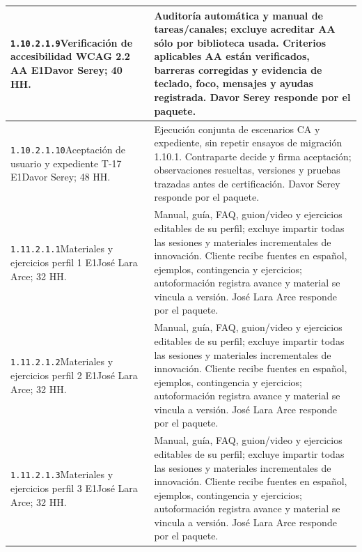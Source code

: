 \begin{longtable}{L{52mm}L{91mm}}
\texttt{1.\allowbreak{}10.\allowbreak{}2.\allowbreak{}1.\allowbreak{}9}\newline Verificación de accesibilidad WCAG 2.2 AA E1\newline Davor Serey; 40 HH. & Auditoría automática y manual de tareas/canales; excluye acreditar AA sólo por biblioteca usada. Criterios aplicables AA están verificados, barreras corregidas y evidencia de teclado, foco, mensajes y ayudas registrada. Davor Serey responde por el paquete.\\\hline
\texttt{1.\allowbreak{}10.\allowbreak{}2.\allowbreak{}1.\allowbreak{}10}\newline Aceptación de usuario y expediente T-17 E1\newline Davor Serey; 48 HH. & Ejecución conjunta de escenarios CA y expediente, sin repetir ensayos de migración 1.10.1. Contraparte decide y firma aceptación; observaciones resueltas, versiones y pruebas trazadas antes de certificación. Davor Serey responde por el paquete.\\\hline
\texttt{1.\allowbreak{}11.\allowbreak{}2.\allowbreak{}1.\allowbreak{}1}\newline Materiales y ejercicios perfil 1 E1\newline José Lara Arce; 32 HH. & Manual, guía, FAQ, guion/video y ejercicios editables de su perfil; excluye impartir todas las sesiones y materiales incrementales de innovación. Cliente recibe fuentes en español, ejemplos, contingencia y ejercicios; autoformación registra avance y material se vincula a versión. José Lara Arce responde por el paquete.\\\hline
\texttt{1.\allowbreak{}11.\allowbreak{}2.\allowbreak{}1.\allowbreak{}2}\newline Materiales y ejercicios perfil 2 E1\newline José Lara Arce; 32 HH. & Manual, guía, FAQ, guion/video y ejercicios editables de su perfil; excluye impartir todas las sesiones y materiales incrementales de innovación. Cliente recibe fuentes en español, ejemplos, contingencia y ejercicios; autoformación registra avance y material se vincula a versión. José Lara Arce responde por el paquete.\\\hline
\texttt{1.\allowbreak{}11.\allowbreak{}2.\allowbreak{}1.\allowbreak{}3}\newline Materiales y ejercicios perfil 3 E1\newline José Lara Arce; 32 HH. & Manual, guía, FAQ, guion/video y ejercicios editables de su perfil; excluye impartir todas las sesiones y materiales incrementales de innovación. Cliente recibe fuentes en español, ejemplos, contingencia y ejercicios; autoformación registra avance y material se vincula a versión. José Lara Arce responde por el paquete.\\\hline

\end{longtable}
